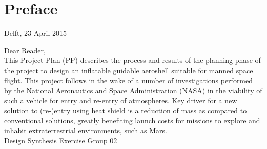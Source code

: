 \section*{Preface}\label{cha:preface}

\begin{flushright}
Delft, 23 April 2015
\end{flushright}

Dear Reader,	
\\ [1cm]
This Project Plan (PP) describes the process and results of the planning phase of the project to design an inflatable guidable aeroshell suitable for manned space flight. This project follows in the wake of a number of investigations performed by the National Aeronautics and Space Administration (NASA) in the viability of such a vehicle for entry and re-entry of atmospheres. Key driver for a new solution to (re-)entry using heat shield is a reduction of mass as compared to conventional solutions, greatly benefiting launch costs for missions to explore and inhabit extraterrestrial environments, such as Mars. 
\\ [1.5cm]
Design Synthesis Exercise Group 02